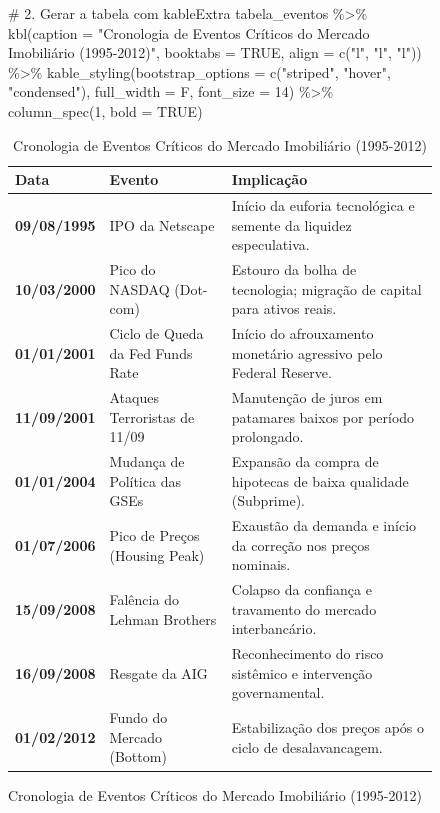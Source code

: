 \documentclass[
  portuguese,
  letterpaper,
  DIV=11,
  numbers=noendperiod,
  oneside]{scrartcl}
\newenvironment{Shaded}{\begin{snugshade}}{\end{snugshade}}
\newcommand{\AttributeTok}[1]{\textcolor[rgb]{0.40,0.45,0.13}{#1}}
\newcommand{\CommentTok}[1]{\textcolor[rgb]{0.37,0.37,0.37}{#1}}
\newcommand{\ConstantTok}[1]{\textcolor[rgb]{0.56,0.35,0.01}{#1}}
\newcommand{\DecValTok}[1]{\textcolor[rgb]{0.68,0.00,0.00}{#1}}
\newcommand{\FunctionTok}[1]{\textcolor[rgb]{0.28,0.35,0.67}{#1}}
\newcommand{\NormalTok}[1]{\textcolor[rgb]{0.00,0.23,0.31}{#1}}
\newcommand{\SpecialCharTok}[1]{\textcolor[rgb]{0.37,0.37,0.37}{#1}}
\newcommand{\StringTok}[1]{\textcolor[rgb]{0.13,0.47,0.30}{#1}}
\begin{document}
\begin{figure}
\begin{Shaded}
\begin{Highlighting}[]
\CommentTok{\# 2. Gerar a tabela com kableExtra}
\NormalTok{tabela\_eventos }\SpecialCharTok{\%\textgreater{}\%}
  \FunctionTok{kbl}\NormalTok{(}\AttributeTok{caption =} \StringTok{"Cronologia de Eventos Críticos do Mercado Imobiliário (1995{-}2012)"}\NormalTok{,}
      \AttributeTok{booktabs =} \ConstantTok{TRUE}\NormalTok{, }
      \AttributeTok{align =} \FunctionTok{c}\NormalTok{(}\StringTok{"l"}\NormalTok{, }\StringTok{"l"}\NormalTok{, }\StringTok{"l"}\NormalTok{)) }\SpecialCharTok{\%\textgreater{}\%}
  \FunctionTok{kable\_styling}\NormalTok{(}\AttributeTok{bootstrap\_options =} \FunctionTok{c}\NormalTok{(}\StringTok{"striped"}\NormalTok{, }\StringTok{"hover"}\NormalTok{, }\StringTok{"condensed"}\NormalTok{),}
                \AttributeTok{full\_width =}\NormalTok{ F, }
                \AttributeTok{font\_size =} \DecValTok{14}\NormalTok{) }\SpecialCharTok{\%\textgreater{}\%}
  \FunctionTok{column\_spec}\NormalTok{(}\DecValTok{1}\NormalTok{, }\AttributeTok{bold =} \ConstantTok{TRUE}\NormalTok{)}
\end{Highlighting}
\end{Shaded}

\begin{table}
\centering
\caption{\label{tab:unnamed-chunk-2}Cronologia de Eventos Críticos do Mercado Imobiliário (1995-2012)}
\centering
\fontsize{14}{16}\selectfont
\begin{tabular}[t]{>{}lll}
\toprule
Data & Evento & Implicação\\
\midrule
\textbf{09/08/1995} & IPO da Netscape & Início da euforia tecnológica e semente da liquidez especulativa.\\
\textbf{10/03/2000} & Pico do NASDAQ (Dot-com) & Estouro da bolha de tecnologia; migração de capital para ativos reais.\\
\textbf{01/01/2001} & Ciclo de Queda da Fed Funds Rate & Início do afrouxamento monetário agressivo pelo Federal Reserve.\\
\textbf{11/09/2001} & Ataques Terroristas de 11/09 & Manutenção de juros em patamares baixos por período prolongado.\\
\textbf{01/01/2004} & Mudança de Política das GSEs & Expansão da compra de hipotecas de baixa qualidade (Subprime).\\
\addlinespace
\textbf{01/07/2006} & Pico de Preços (Housing Peak) & Exaustão da demanda e início da correção nos preços nominais.\\
\textbf{15/09/2008} & Falência do Lehman Brothers & Colapso da confiança e travamento do mercado interbancário.\\
\textbf{16/09/2008} & Resgate da AIG & Reconhecimento do risco sistêmico e intervenção governamental.\\
\textbf{01/02/2012} & Fundo do Mercado (Bottom) & Estabilização dos preços após o ciclo de desalavancagem.\\
\bottomrule
\end{tabular}
\end{table}

\end{figure}%
\end{document}
